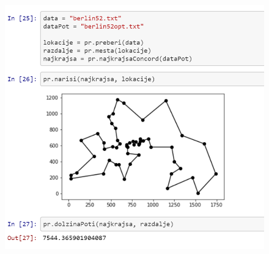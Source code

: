 \documentclass[12pt,a4paper]{amsart}
\theoremstyle{definition} %
\theoremstyle{plain} %
\begin{document}
\begin{figure}[ht]
\centering
\includegraphics[width=100 mm, scale = 0.7]{optimum}
\end{figure}
\end{document}
